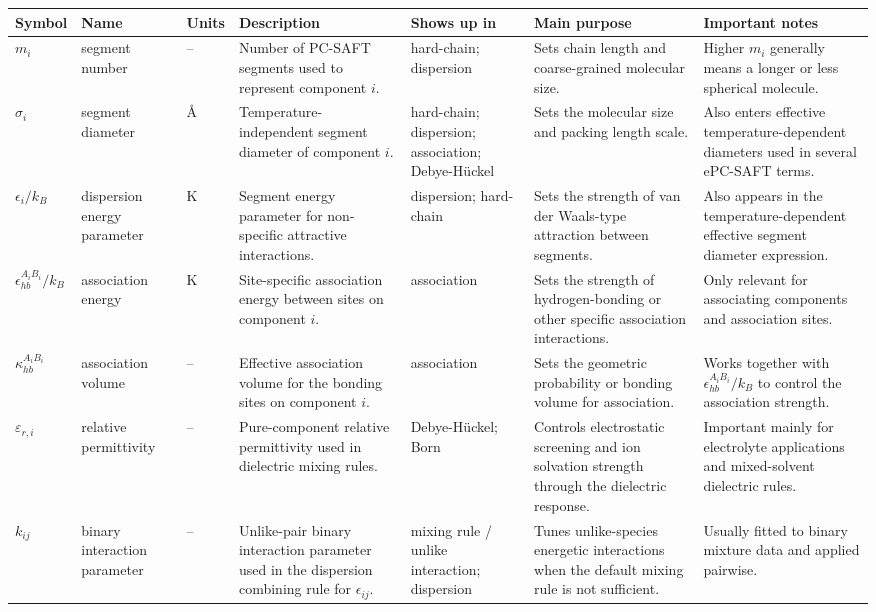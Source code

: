 \begin{tabular}{p{2.6cm} p{2.9cm} p{1.2cm} p{3.8cm} p{3.1cm} p{3.6cm} p{4.0cm}}
\hline
\textbf{Symbol} & \textbf{Name} & \textbf{Units} & \textbf{Description} & \textbf{Shows up in} & \textbf{Main purpose} & \textbf{Important notes} \\
\hline
$m_i$ & segment number & -- & Number of PC-SAFT segments used to represent component $i$. & hard-chain; dispersion & Sets chain length and coarse-grained molecular size. & Higher $m_i$ generally means a longer or less spherical molecule. \\
$\sigma_i$ & segment diameter & \AA & Temperature-independent segment diameter of component $i$. & hard-chain; dispersion; association; Debye-H\"uckel & Sets the molecular size and packing length scale. & Also enters effective temperature-dependent diameters used in several ePC-SAFT terms. \\
$\epsilon_i/k_B$ & dispersion energy parameter & K & Segment energy parameter for non-specific attractive interactions. & dispersion; hard-chain & Sets the strength of van der Waals-type attraction between segments. & Also appears in the temperature-dependent effective segment diameter expression. \\
$\epsilon_{hb}^{A_iB_i}/k_B$ & association energy & K & Site-specific association energy between sites on component $i$. & association & Sets the strength of hydrogen-bonding or other specific association interactions. & Only relevant for associating components and association sites. \\
$\kappa_{hb}^{A_iB_i}$ & association volume & -- & Effective association volume for the bonding sites on component $i$. & association & Sets the geometric probability or bonding volume for association. & Works together with $\epsilon_{hb}^{A_iB_i}/k_B$ to control the association strength. \\
$\varepsilon_{r,i}$ & relative permittivity & -- & Pure-component relative permittivity used in dielectric mixing rules. & Debye-H\"uckel; Born & Controls electrostatic screening and ion solvation strength through the dielectric response. & Important mainly for electrolyte applications and mixed-solvent dielectric rules. \\
$k_{ij}$ & binary interaction parameter & -- & Unlike-pair binary interaction parameter used in the dispersion combining rule for $\epsilon_{ij}$. & mixing rule / unlike interaction; dispersion & Tunes unlike-species energetic interactions when the default mixing rule is not sufficient. & Usually fitted to binary mixture data and applied pairwise. \\
\hline
\end{tabular}
